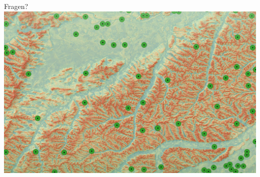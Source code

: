 \begin{frame}{\alert{Fragen?}}
 \centering\includegraphics[width=1\textwidth]{FIGURE/big_cover-remotesensing-v14-i10.png}     
\end{frame}
